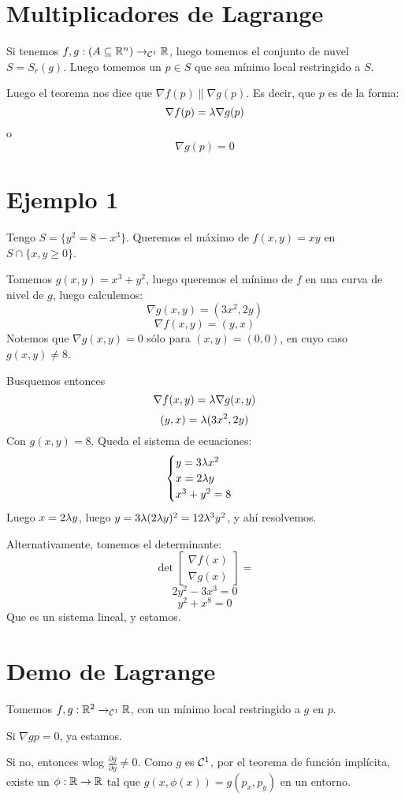\documentclass{article}
\begin{document}
\section*{Multiplicadores de Lagrange}
Si tenemos $f,g : (A \subseteq \mathbb{R}^n) \to_{\mathcal{C}^1} \mathbb{R}$, luego tomemos el conjunto de nuvel $S = S_r(g)$. Luego tomemos un $p \in S$ que sea mínimo local restringido a $S$.

Luego el teorema nos dice que $\nabla f(p) \parallel \nabla g(p)$. Es decir, que $p$ es de la forma:
\[
	\nabla f(p) = \lambda \nabla g(p)
\]
o
\[
	\nabla g(p) = 0
\]
\section*{Ejemplo 1}
Tengo $S = \{y^2 = 8 - x^3\}$. Queremos el máximo de $f(x,y) = xy$ en $S \cap \{x,y \geq 0\}$.

Tomemos $g(x,y) = x^3 + y^2$, luego queremos el mínimo de $f$ en una curva de nivel de $g$, luego calculemos:
\[
	\nabla g(x,y) = (3x^2, 2y)
\]
\[
	\nabla f(x,y) = (y,x)
\]
Notemos que $\nabla g(x,y) = 0$ sólo para $(x,y) = (0,0)$, en cuyo caso $g(x,y) \neq 8$.

Busquemos entonces
\[
	\nabla f(x,y) = \lambda \nabla g(x,y)
\]
\[
	(y, x) = \lambda (3x^2, 2y)
\]
Con $g(x,y) = 8$. Queda el sistema de ecuaciones:
\[
	\begin{cases}
		y = 3\lambda x^2 \\
		x = 2\lambda y \\
		x^3 + y^2 = 8 \\
	\end{cases}
\]
Luego $x = 2\lambda y$, luego $y = 3\lambda (2\lambda y)^2 = 12\lambda^3 y^2$, y ahí resolvemos.

Alternativamente, tomemos el determinante:
\[
	\det \begin{bmatrix}
		\nabla f(x) \\
		\nabla g(x)
	\end{bmatrix} =
\]
\[
	2y^2 - 3x^3 = 0
\]
\[
	y^2 + x^8 = 0
\]
Que es un sistema lineal, y estamos.
\section*{Demo de Lagrange}
Tomemos $f, g : \mathbb{R}^2 \to_{\mathcal{C}^1} \mathbb{R}$, con un mínimo local restringido a $g$ en $p$.

Si $\nabla gp = 0$, ya estamos.

Si no, entonces wlog $\frac{\partial g}{\partial y} \neq 0$. Como $g$ es $\mathcal{C}^1$, por el teorema de función implícita, existe un $\phi : \mathbb{R} \to \mathbb{R}$ tal que $g(x, \phi (x)) = g(p_x,p_y)$ en un entorno.
\end{document}
